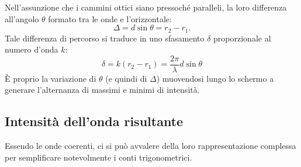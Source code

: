 \documentclass[a4paper,11pt]{report}
\begin{document}
\noindent
Nell'assunzione che i cammini ottici siano pressoché paralleli, la loro differenza all'angolo $\theta$ formato tra le onde e l'orizzontale:
\begin{equation}
    \Delta = d \sin\theta = r_2 - r_1.
\end{equation}
Tale differenza di percorso si traduce in uno sfasamento $\delta$ proporzionale al numero d'onda $k$:
\begin{equation}
    \delta = k(r_2 - r_1) = \frac{2\pi}{\lambda} d \sin\theta
\end{equation}
È proprio la variazione di $\theta$ (e quindi di $\Delta$) muovendosi lungo lo schermo a generare l'alternanza di massimi e minimi di intensità.

\subsection{Intensità dell'onda risultante}
Essendo le onde coerenti, ci si può avvalere della loro rappresentazione complessa per semplificare notevolmente i conti trigonometrici. 
\end{document}
